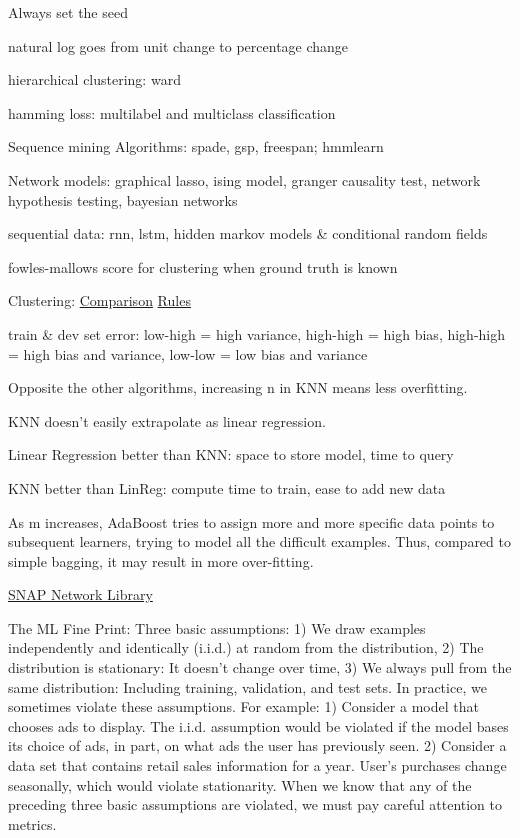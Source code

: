 \documentclass[]{book}
\begin{document}
Always set the seed

natural log goes from unit change to percentage change

hierarchical clustering: ward

hamming loss: multilabel and multiclass classification

Sequence mining Algorithms: spade, gsp, freespan; hmmlearn

Network models: graphical lasso, ising model, granger causality test, network hypothesis testing, bayesian networks

sequential data: rnn, lstm, hidden markov models \& conditional random fields

fowles-mallows score for clustering when ground truth is known

Clustering: \href{http://scikit-learn.org/stable/modules/clustering.html\#clustering}{Comparison} \href{https://twitter.com/thomaswdinsmore/status/965223193043718145}{Rules}

train \& dev set error: low-high = high variance, high-high = high bias, high-high = high bias and variance, low-low = low bias and variance

Opposite the other algorithms, increasing n in KNN means less overfitting.

KNN doesn't easily extrapolate as linear regression.

Linear Regression better than KNN: space to store model, time to query

KNN better than LinReg: compute time to train, ease to add new data

As m increases, AdaBoost tries to assign more and more specific data points to subsequent learners, trying to model all the difficult examples. Thus, compared to simple bagging, it may result in more over-fitting.

\href{https://snap.stanford.edu/snappy/index.html}{SNAP Network Library}

The ML Fine Print: Three basic assumptions: 1) We draw examples independently and identically (i.i.d.) at random from the distribution, 2) The distribution is stationary: It doesn't change over time, 3) We always pull from the same distribution: Including training, validation, and test sets. In practice, we sometimes violate these assumptions. For example: 1) Consider a model that chooses ads to display. The i.i.d. assumption would be violated if the model bases its choice of ads, in part, on what ads the user has previously seen. 2) Consider a data set that contains retail sales information for a year. User's purchases change seasonally, which would violate stationarity. When we know that any of the preceding three basic assumptions are violated, we must pay careful attention to metrics.
\end{document}
